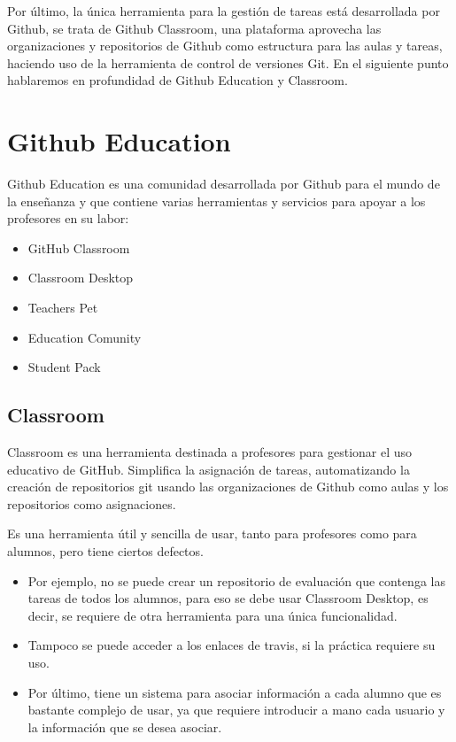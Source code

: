 Por último, la única herramienta para la gestión de tareas está desarrollada por Github, se trata de Github Classroom, una plataforma aprovecha las organizaciones y repositorios de Github como estructura para las aulas y tareas, haciendo uso de la herramienta de control de versiones Git. En el siguiente punto hablaremos en profundidad de Github Education y Classroom.


\section{Github Education}
\label{1:sec:2}

Github Education \cite{B12} es una comunidad desarrollada por Github  para el mundo de la enseñanza y que contiene varias herramientas  y servicios para apoyar a los profesores en su labor:

\begin{itemize}
  \item GitHub Classroom \cite{B13}
  \item Classroom Desktop
  \item Teachers Pet
  \item Education Comunity \cite{B12}
  \item Student Pack
\end{itemize}

\subsection{Classroom}

Classroom es una herramienta destinada a profesores para gestionar
el uso educativo de GitHub. Simplifica la asignación de tareas,
automatizando la creación de repositorios git usando las organizaciones
de Github como aulas y los repositorios como asignaciones. 

Es una
herramienta útil y sencilla de usar, tanto para profesores como
para alumnos, pero tiene ciertos defectos. 

\begin{itemize}
\item Por ejemplo, no se puede
crear un repositorio de evaluación que contenga las tareas de todos
los alumnos, para eso se debe usar Classroom Desktop, es decir, se
requiere de otra herramienta para una única funcionalidad. 

\item Tampoco
se puede acceder a los enlaces de travis, si la práctica requiere
su uso. 

\item Por último, tiene un sistema para asociar información a
cada alumno que es bastante complejo de usar, ya que requiere
introducir a mano cada usuario y la información que se desea asociar.
\end{itemize}

